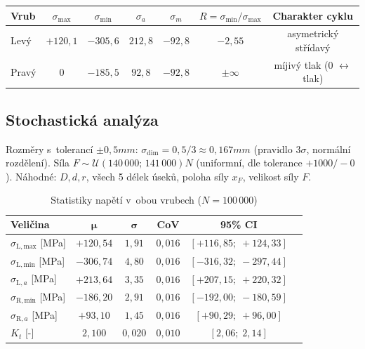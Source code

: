\begin{center}
\begin{tabular}{lcccccc}
\toprule
\textbf{Vrub} & $\sigma_{\max}$ & $\sigma_{\min}$ & $\sigma_a$ & $\sigma_m$ & $R = \sigma_{\min}/\sigma_{\max}$ & \textbf{Charakter cyklu} \\
\midrule
Levý  & $+120{,}1$ & $-305{,}6$ & $212{,}8$ & $-92{,}8$ & $-2{,}55$ & asymetrický střídavý \\
Pravý & $0$        & $-185{,}5$ & $92{,}8$  & $-92{,}8$ & $\pm\infty$ & míjivý tlak (0 $\leftrightarrow$ tlak) \\
\bottomrule
\end{tabular}
\end{center}

\subsection{Stochastická analýza}

Rozměry s~tolerancí $\pm 0{,}5\unit{mm}$: $\sigma_{\mathrm{dim}} = 0{,}5/3 \approx 0{,}167\unit{mm}$ (pravidlo $3\sigma$, normální rozdělení). Síla $F \sim \mathcal{U}(140\,000;\,141\,000)\unit{N}$ (uniformní, dle tolerance $+1000/-0$). Náhodné: $D, d, r$, všech 5 délek úseků, poloha síly $x_F$, velikost síly $F$.

\begin{table}[H]
\centering
\caption{Statistiky napětí v~obou vrubech ($N = 100\,000$)}
\begin{tabular}{lccccc}
\toprule
\textbf{Veličina} & $\boldsymbol{\mu}$ & $\boldsymbol{\sigma}$ & \textbf{CoV} & \textbf{95\% CI} \\
\midrule
$\sigma_{\mathrm{L,max}}$ [MPa] & $+120{,}54$ & $1{,}91$ & $0{,}016$ & $[+116{,}85;\; +124{,}33]$ \\
$\sigma_{\mathrm{L,min}}$ [MPa] & $-306{,}74$ & $4{,}80$ & $0{,}016$ & $[-316{,}32;\; -297{,}44]$ \\
$\sigma_{\mathrm{L},a}$    [MPa] & $+213{,}64$ & $3{,}35$ & $0{,}016$ & $[+207{,}15;\; +220{,}32]$ \\
$\sigma_{\mathrm{R,min}}$ [MPa] & $-186{,}20$ & $2{,}91$ & $0{,}016$ & $[-192{,}00;\; -180{,}59]$ \\
$\sigma_{\mathrm{R},a}$    [MPa] & $+93{,}10$  & $1{,}45$ & $0{,}016$ & $[+90{,}29;\; +96{,}00]$ \\
$K_t$ [-] & $2{,}100$ & $0{,}020$ & $0{,}010$ & $[2{,}06;\; 2{,}14]$ \\
\bottomrule
\end{tabular}
\end{table}

